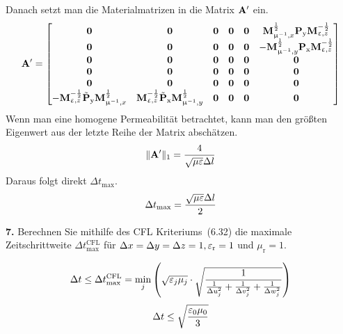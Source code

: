 \documentclass[Protokollheft.tex]{subfiles}
\begin{document}
Danach setzt man die Materialmatrizen in die Matrix $ \mathbf{A} '$ ein.
$$ \mathbf{A} '= \begin{bmatrix}
\boldsymbol{0} &\boldsymbol{0} &\boldsymbol{0} &\boldsymbol{0} &\boldsymbol{0} & \mathbf{M}^{\frac12}_{\upmu^{-1},x} \mathbf{P} _\mathrm{y} \mathbf{M}^{-\frac12}_{\upvarepsilon, z}\\
\boldsymbol{0} &\boldsymbol{0} &\boldsymbol{0} &\boldsymbol{0} &\boldsymbol{0} & -\mathbf{M}^{\frac12}_{\upmu^{-1},y} \mathbf{P} _\mathrm{x} \mathbf{M}^{-\frac12}_{\upvarepsilon, z}\\
\boldsymbol{0} &\boldsymbol{0} &\boldsymbol{0} &\boldsymbol{0} &\boldsymbol{0} & \boldsymbol{0}\\
\boldsymbol{0} &\boldsymbol{0} &\boldsymbol{0} &\boldsymbol{0} &\boldsymbol{0} & \boldsymbol{0}\\
\boldsymbol{0} &\boldsymbol{0} &\boldsymbol{0} &\boldsymbol{0} &\boldsymbol{0} & \boldsymbol{0}\\
-\mathbf{M}^{-\frac12}_{\upvarepsilon, z}\tilde{ \mathbf{P} }_\mathrm{y}\mathbf{M}^{\frac12}_{\upmu^{-1},x} & \mathbf{M}^{-\frac12}_{\upvarepsilon, z}\tilde{ \mathbf{P} }_\mathrm{x}\mathbf{M}^{\frac12}_{\upmu^{-1},y} & \boldsymbol{0} &\boldsymbol{0} &\boldsymbol{0} &\boldsymbol{0}
\end{bmatrix}$$
\noindent
Wenn man eine homogene Permeabilität betrachtet, kann man den größten Eigenwert aus der letzte Reihe der Matrix abschätzen.
$$\| \mathbf{A} '\|_1 = \frac{4}{\sqrt{\mu\varepsilon}\Delta l}$$
Daraus folgt direkt $\Delta t_{\text{max}}$.
$$ \Delta t_{\text{max}}=\frac{\sqrt{\mu\varepsilon}\Delta l}{2}$$


\begin{framed}
	\noindent \textbf{7.} Berechnen Sie mithilfe des CFL Kriteriums~(6.32) die maximale
    Zeitschrittweite $\Delta t_{\text{max}}^{\text{CFL}}$ für $\Delta x=\Delta
    y=\Delta z=1, \varepsilon_\text{r}=1$ und $\mu_\text{r}=1$.\label{exer:deltaTmaxCFL}
\end{framed}

$$\Delta t \leq \Delta t_{\text{max}}^{\text{CFL}} = \min_j\left(\sqrt{\varepsilon_j \mu_j}\cdot \sqrt{\frac{1}{\frac{1}{\Delta u^2_j}+ \frac{1}{\Delta v^2_j}+\frac{1}{\Delta w^2_j}   }}     \right)$$
$$\Delta t \leq \sqrt{\frac{\varepsilon_0\mu_0}{3}} $$
\end{document}
